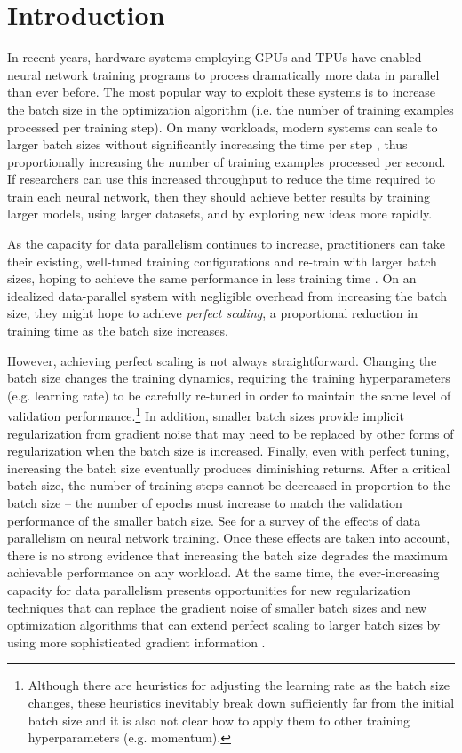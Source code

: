 \documentclass{article}
\begin{document}
\section{Introduction}\label{sec:intro}

In recent years, hardware systems employing GPUs and TPUs have enabled neural network training programs to process dramatically more data in parallel than ever before.
The most popular way to exploit these systems is to increase the batch size in the optimization algorithm (i.e. the number of training examples processed per training step).
On many workloads, modern systems can scale to larger batch sizes without significantly increasing the time per step \citep{jouppi2017datacenter,wang2019benchmarking}, thus proportionally increasing the number of training examples processed per second.
If researchers can use this increased throughput to reduce the time required to train each neural network, then they should achieve better results by training larger models, using larger datasets, and by exploring new ideas more rapidly.



As the capacity for data parallelism continues to increase, practitioners can take their existing, well-tuned training configurations and re-train with larger batch sizes, hoping to achieve the same performance in less training time \citep[e.g.][]{ying2018image}.
On an idealized data-parallel system with negligible overhead from increasing the batch size, they might hope to achieve \textit{perfect scaling}, a proportional reduction in training time as the batch size increases.

However, achieving perfect scaling is not always straightforward.
Changing the batch size changes the training dynamics, requiring the training hyperparameters (e.g. learning rate) to be carefully re-tuned in order to maintain the same level of validation performance.\footnote{Although there are heuristics for adjusting the learning rate as the batch size changes, these heuristics inevitably break down sufficiently far from the initial batch size and it is also not clear how to apply them to other training hyperparameters (e.g. momentum).}
In addition, smaller batch sizes provide implicit regularization from gradient noise that may need to be replaced by other forms of regularization when the batch size is increased.
Finally, even with perfect tuning, increasing the batch size eventually produces diminishing returns.
After a critical batch size, the number of training steps cannot be decreased in proportion to the batch size -- the number of epochs must increase to match the validation performance of the smaller batch size. See \citealt{shallue2019measuring} for a survey of the effects of data parallelism on neural network training. 
Once these effects are taken into account, there is no strong evidence that increasing the batch size degrades the maximum achievable performance on any workload.
At the same time, the ever-increasing capacity for data parallelism presents opportunities for new regularization techniques that can replace the gradient noise of smaller batch sizes and new optimization algorithms that can extend perfect scaling to larger batch sizes by using more sophisticated gradient information \citep{zhang2019algorithmic}.
\end{document}
